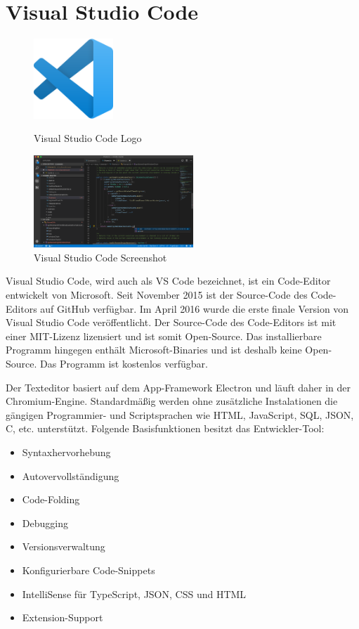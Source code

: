 \section{Visual Studio Code}
\begin{figure}[htb]
    \begin{center}
        \includegraphics[width=3cm] {./pics/Visual_Studio_Code_1.35_icon.svg.png}
        \caption{Visual Studio Code Logo \cite{VsCodeLogo}}
        \includegraphics[width=6cm]{./pics/VS_Code_1.36.0-insider.png}
        \caption{Visual Studio Code Screenshot \cite{VSCodeScreenshotPic}}
    \end{center}
\end{figure}

\cite{VsCodeDoc}
\cite{VsCodeWiki}
\cite{VsCodeWU}

Visual Studio Code, wird auch als VS Code bezeichnet, ist ein Code-Editor entwickelt von Microsoft. 
Seit November 2015 ist der Source-Code des Code-Editors auf GitHub verfügbar. Im April 2016 wurde die erste finale Version 
von Visual Studio Code veröffentlicht. Der Source-Code des Code-Editors ist mit einer MIT-Lizenz lizensiert und ist somit Open-Source.
Das installierbare Programm hingegen enthält Microsoft-Binaries und ist deshalb keine Open-Source. Das Programm ist kostenlos verfügbar.

Der Texteditor basiert auf dem App-Framework Electron und läuft daher in der Chromium-Engine. Standardmäßig werden ohne zusätzliche Instalationen
die gängigen Programmier- und Scriptsprachen wie HTML, JavaScript, SQL, JSON, C, etc. unterstützt. 
Folgende Basisfunktionen besitzt das Entwickler-Tool:

\begin{itemize}
    \item Syntaxhervorhebung
    \item Autovervollständigung
    \item Code-Folding %
    \item Debugging
    \item Versionsverwaltung
    \item Konfigurierbare Code-Snippets
    \item IntelliSense für TypeScript, JSON, CSS und HTML
    \item Extension-Support
\end{itemize}


